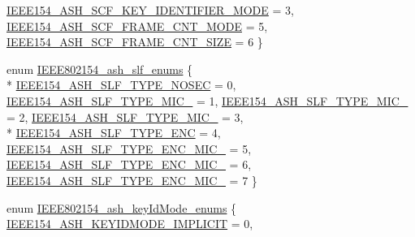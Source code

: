 \begin{DoxyCompactItemize}
\hyperlink{group___i_e_e_e802154_gga14bfc1b026f797e3faedb39d557df3c2a4ea77226a4e6d2c56086713e9d1d7a9a}{I\+E\+E\+E154\+\_\+\+A\+S\+H\+\_\+\+S\+C\+F\+\_\+\+K\+E\+Y\+\_\+\+I\+D\+E\+N\+T\+I\+F\+I\+E\+R\+\_\+\+M\+O\+DE} = 3, 
\hyperlink{group___i_e_e_e802154_gga14bfc1b026f797e3faedb39d557df3c2aef8ddddf498e2f4e5db5be085c149563}{I\+E\+E\+E154\+\_\+\+A\+S\+H\+\_\+\+S\+C\+F\+\_\+\+F\+R\+A\+M\+E\+\_\+\+C\+N\+T\+\_\+\+M\+O\+DE} = 5, 
\hyperlink{group___i_e_e_e802154_gga14bfc1b026f797e3faedb39d557df3c2ad7466be9798ec4ffe585b73c4f004e8d}{I\+E\+E\+E154\+\_\+\+A\+S\+H\+\_\+\+S\+C\+F\+\_\+\+F\+R\+A\+M\+E\+\_\+\+C\+N\+T\+\_\+\+S\+I\+ZE} = 6
 \}
\item 
enum \hyperlink{group___i_e_e_e802154_ga7fbd5848033319a355b464ca4f7c1dd7}{I\+E\+E\+E802154\+\_\+ash\+\_\+slf\+\_\+enums} \{ \\*
\hyperlink{group___i_e_e_e802154_gga7fbd5848033319a355b464ca4f7c1dd7a91fcd71d6d8544bdda76bf955c8d4e15}{I\+E\+E\+E154\+\_\+\+A\+S\+H\+\_\+\+S\+L\+F\+\_\+\+T\+Y\+P\+E\+\_\+\+N\+O\+S\+EC} = 0, 
\hyperlink{group___i_e_e_e802154_gga7fbd5848033319a355b464ca4f7c1dd7a73e08558f104b9f218ad10674aef3380}{I\+E\+E\+E154\+\_\+\+A\+S\+H\+\_\+\+S\+L\+F\+\_\+\+T\+Y\+P\+E\+\_\+\+M\+I\+C\+\_} = 1, 
\hyperlink{group___i_e_e_e802154_gga7fbd5848033319a355b464ca4f7c1dd7ac9b451c7b9ab651d07fc74bd409510d1}{I\+E\+E\+E154\+\_\+\+A\+S\+H\+\_\+\+S\+L\+F\+\_\+\+T\+Y\+P\+E\+\_\+\+M\+I\+C\+\_} = 2, 
\hyperlink{group___i_e_e_e802154_gga7fbd5848033319a355b464ca4f7c1dd7a0ea504b3f043914dd8655dd69472b426}{I\+E\+E\+E154\+\_\+\+A\+S\+H\+\_\+\+S\+L\+F\+\_\+\+T\+Y\+P\+E\+\_\+\+M\+I\+C\+\_} = 3, 
\\*
\hyperlink{group___i_e_e_e802154_gga7fbd5848033319a355b464ca4f7c1dd7a6c25f54875f752be3495434f7cb28d7c}{I\+E\+E\+E154\+\_\+\+A\+S\+H\+\_\+\+S\+L\+F\+\_\+\+T\+Y\+P\+E\+\_\+\+E\+NC} = 4, 
\hyperlink{group___i_e_e_e802154_gga7fbd5848033319a355b464ca4f7c1dd7ac96d7d652ca225b526d152dad85699db}{I\+E\+E\+E154\+\_\+\+A\+S\+H\+\_\+\+S\+L\+F\+\_\+\+T\+Y\+P\+E\+\_\+\+E\+N\+C\+\_\+\+M\+I\+C\+\_} = 5, 
\hyperlink{group___i_e_e_e802154_gga7fbd5848033319a355b464ca4f7c1dd7a3e3a4b267dbf81e586717b469540131c}{I\+E\+E\+E154\+\_\+\+A\+S\+H\+\_\+\+S\+L\+F\+\_\+\+T\+Y\+P\+E\+\_\+\+E\+N\+C\+\_\+\+M\+I\+C\+\_} = 6, 
\hyperlink{group___i_e_e_e802154_gga7fbd5848033319a355b464ca4f7c1dd7a4d3e3303996a9cbce1c20380dfe93021}{I\+E\+E\+E154\+\_\+\+A\+S\+H\+\_\+\+S\+L\+F\+\_\+\+T\+Y\+P\+E\+\_\+\+E\+N\+C\+\_\+\+M\+I\+C\+\_} = 7
 \}
\item 
enum \hyperlink{group___i_e_e_e802154_ga7eb52d4e2fb73e05839ec5e7ff1a1afb}{I\+E\+E\+E802154\+\_\+ash\+\_\+key\+Id\+Mode\+\_\+enums} \{ \hyperlink{group___i_e_e_e802154_gga7eb52d4e2fb73e05839ec5e7ff1a1afbab2e8a1892af5ddf4e416eb777dc866a8}{I\+E\+E\+E154\+\_\+\+A\+S\+H\+\_\+\+K\+E\+Y\+I\+D\+M\+O\+D\+E\+\_\+\+I\+M\+P\+L\+I\+C\+IT} = 0, 

\end{DoxyCompactItemize}
